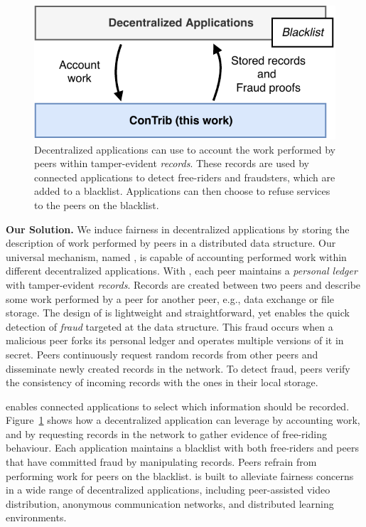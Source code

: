 \begin{figure}[t]
	\centering
	\includegraphics[width=.7\linewidth]{trustchain/assets/contrib_app_interaction}
	\caption{Decentralized applications can use \ModelName{} to account the work performed by peers within tamper-evident \emph{records}. These records are used by connected applications to detect free-riders and fraudsters, which are added to a blacklist. Applications can then choose to refuse services to the peers on the blacklist.}
	\label{fig:interaction_with_apps}
\end{figure}


\textbf{Our Solution.}
We induce fairness in decentralized applications by storing the description of work performed by peers in a distributed data structure.
Our universal mechanism, named \ModelName{}, is capable of accounting performed work within different decentralized applications.
With \ModelName{}, each peer maintains a \emph{personal ledger} with tamper-evident \emph{records}.
Records are created between two peers and describe some work performed by a peer for another peer, e.g., data exchange or file storage.
The design of \ModelName{} is lightweight and straightforward, yet enables the quick detection of \emph{fraud} targeted at the data structure.
This fraud occurs when a malicious peer forks its personal ledger and operates multiple versions of it in secret.
Peers continuously request random records from other peers and disseminate newly created records in the network.
To detect fraud, peers verify the consistency of incoming records with the ones in their local storage.

\ModelName{} enables connected applications to select which information should be recorded.
Figure~\ref{fig:interaction_with_apps} shows how a decentralized application can leverage \ModelName{} by accounting work, and by requesting records in the network to gather evidence of free-riding behaviour.
Each application maintains a blacklist with both free-riders and peers that have committed fraud by manipulating records.
Peers refrain from performing work for peers on the blacklist.
\ModelName{} is built to alleviate fairness concerns in a wide range of decentralized applications, including peer-assisted video distribution, anonymous communication networks, and distributed learning environments.

